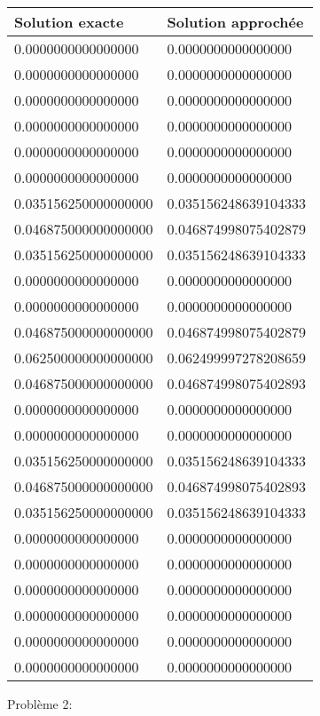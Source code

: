 \documentclass[a4paper,12pt,twoside]{report}
\begin{document}
\begin{tabular}{|l|l|}
  \hline
  Solution exacte & Solution approchée \\
  \hline
 0.0000000000000000 &0.0000000000000000 \\
 0.0000000000000000 &0.0000000000000000 \\
 0.0000000000000000 &0.0000000000000000 \\
 0.0000000000000000 &0.0000000000000000 \\
 0.0000000000000000 &0.0000000000000000 \\
0.0000000000000000 &0.0000000000000000 \\
0.035156250000000000&0.035156248639104333\\
0.046875000000000000&0.046874998075402879 \\  
0.035156250000000000&0.035156248639104333\\
 0.0000000000000000 &0.0000000000000000 \\
0.0000000000000000 &0.0000000000000000 \\

0.046875000000000000  & 0.046874998075402879\\        
 0.062500000000000000&0.062499997278208659 \\        
0.046875000000000000& 0.046874998075402893 \\ 
 0.0000000000000000 &0.0000000000000000 \\
0.0000000000000000 &0.0000000000000000 \\
0.035156250000000000 &0.035156248639104333\\        
0.046875000000000000 &0.046874998075402893 \\         
0.035156250000000000 &0.035156248639104333 \\
 0.0000000000000000 &0.0000000000000000 \\
 0.0000000000000000 &0.0000000000000000 \\
 0.0000000000000000 &0.0000000000000000 \\
 0.0000000000000000 &0.0000000000000000 \\
 0.0000000000000000 &0.0000000000000000 \\
0.0000000000000000 &0.0000000000000000 \\
  \hline
\end{tabular}

\clearpage
Problème 2:
\end{document}
